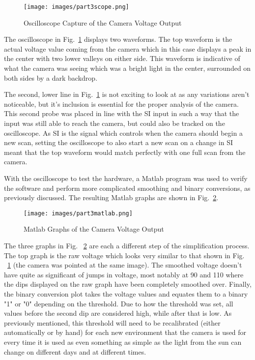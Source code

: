 \documentclass[conference]{IEEEtran}
\begin{document}
\begin{figure}
    \centering
    \texttt{[image: images/part3scope.png]}
    \caption{Oscilloscope Capture of the Camera Voltage Output}
    \label{oscilloscope}
\end{figure}

The oscilloscope in Fig.~\ref{oscilloscope} displays two waveforms. The top
waveform is the actual voltage value coming from the camera which in this case
displays a peak in the center with two lower valleys on either side. This
waveform is indicative of what the camera was seeing which was a bright light
in the center, surrounded on both sides by a dark backdrop.

The second, lower line in Fig.~\ref{oscilloscope} is not exciting to look at
as any variations aren't noticeable, but it's inclusion is essential for the
proper analysis of the camera. This second probe was placed in line with the
SI input in such a way that the input was still able to reach the camera, but
could also be tracked on the oscilloscope. As SI is the signal which controls
when the camera should begin a new scan, setting the oscilloscope to also
start a new scan on a change in SI meant that the top waveform would match
perfectly with one full scan from the camera.

With the oscilloscope to test the hardware, a Matlab program was used to
verify the software and perform more complicated smoothing and binary
conversions, as previously discussed. The resulting Matlab graphs are shown in
Fig.~\ref{matlab}.

\begin{figure}
    \centering
    \texttt{[image: images/part3matlab.png]}
    \caption{Matlab Graphs of the Camera Voltage Output}
    \label{matlab}
\end{figure}

The three graphs in Fig. ~\ref{matlab} are each a different step of the
simplification process. The top graph is the raw voltage which looks very
similar to that shown in Fig. ~\ref{oscilloscope} (the camera was pointed at
the same image). The smoothed voltage doesn't have quite as significant of
jumps in voltage, most notably at 90 and 110 where the dips displayed on the
raw graph have been completely smoothed over. Finally, the binary conversion
plot takes the voltage values and equates them to a binary "1" or "0"
depending on the threshold. Due to how the threshold was set, all values
before the second dip are considered high, while after that is low. As
previously mentioned, this threshold will need to be recalibrated (either
automatically or by hand) for each new environment that the camera is used for
every time it is used as even something as simple as the light from the sun
can change on different days and at different times.
\end{document}
